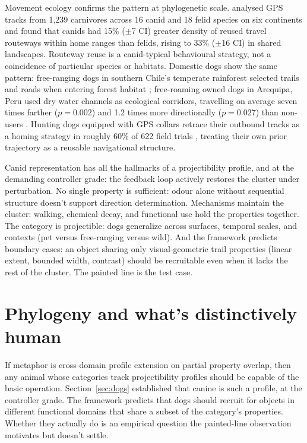 \documentclass[12pt]{article}
\begin{document}
Movement ecology confirms the pattern at phylogenetic scale. \textcite{fagan2025} analysed GPS tracks from 1,239 carnivores across 16 canid and 18 felid species on six continents and found that canids had 15\% ($\pm$7 CI) greater density of reused travel routeways within home ranges than felids, rising to 33\% ($\pm$16 CI) in shared landscapes. Routeway reuse is a canid-typical behavioural strategy, not a coincidence of particular species or habitats. Domestic dogs show the same pattern: free-ranging dogs in southern Chile's temperate rainforest selected trails and roads when entering forest habitat \citep{sepulveda2015}; free-roaming owned dogs in Arequipa, Peru used dry water channels as ecological corridors, travelling on average seven times farther ($p = 0.002$) and 1.2 times more directionally ($p = 0.027$) than non-users \citep{raynor2020}. Hunting dogs equipped with GPS collars retrace their outbound tracks as a homing strategy in roughly 60\% of 622 field trials \citep{benediktova2020}, treating their own prior trajectory as a reusable navigational structure.

Canid  representation has all the hallmarks of a projectibility profile, and at the demanding controller grade: the feedback loop actively restores the cluster under perturbation. No single property is sufficient: odour alone without sequential structure doesn't support direction determination. Mechanisms maintain the cluster: walking, chemical decay, and functional use hold the properties together. The category is projectible: dogs generalize across surfaces, temporal scales, and contexts (pet versus free-ranging versus wild). And the framework predicts boundary cases: an object sharing only visual-geometric trail properties (linear extent, bounded width, contrast) should be recruitable even when it lacks the rest of the cluster. The painted line is the test case.

\section{Phylogeny and what's distinctively human}
\label{sec:phylogeny}

If metaphor is cross-domain profile extension on partial property overlap, then any animal whose categories track projectibility profiles should be capable of the basic operation. Section~\ref{sec:dogs} established that canine  is such a profile, at the controller grade. The framework predicts that dogs should recruit  for objects in different functional domains that share a subset of the category's properties. Whether they actually do is an empirical question the painted-line observation motivates but doesn't settle.
\end{document}
